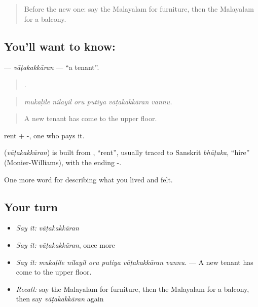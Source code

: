 \label{lesson:ML-C570-vatakakkaran}



\begin{quote}
Before the new one: say the Malayalam for furniture, then the Malayalam for a balcony.
\end{quote}

\subsection*{You'll want to know: }
\textbf{} — \emph{vāṭakakkāran} — \textquotedblleft{}a tenant\textquotedblright{}.

\begin{quote}
     .
\end{quote}

\begin{quote}
\emph{mukaḷile nilayil oru putiya vāṭakakkāran vannu.}
\end{quote}

\begin{quote}
A new tenant has come to the upper floor.
\end{quote}

 rent + -, one who pays it.

\begin{cousinweb}
\textbf{} (\emph{vāṭakakkāran}) is built from , \textquotedblleft{}rent\textquotedblright{}, usually traced to Sanskrit \emph{bhāṭaka}, \textquotedblleft{}hire\textquotedblright{} (Monier-Williams), with the ending -.
\end{cousinweb}

\begin{grammarlens}[title={What you've built}]
One more word for describing what you lived and felt.
\end{grammarlens}

\subsection*{Your turn}
\begin{itemize}
\raggedright
  \item \emph{Say it:} \emph{vāṭakakkāran}
  \item \emph{Say it:} \emph{vāṭakakkāran}, once more
  \item \emph{Say it:} \emph{mukaḷile nilayil oru putiya vāṭakakkāran vannu.} — A new tenant has come to the upper floor.
  \item \emph{Recall:} say the Malayalam for furniture, then the Malayalam for a balcony, then say \emph{vāṭakakkāran} again
\end{itemize}

